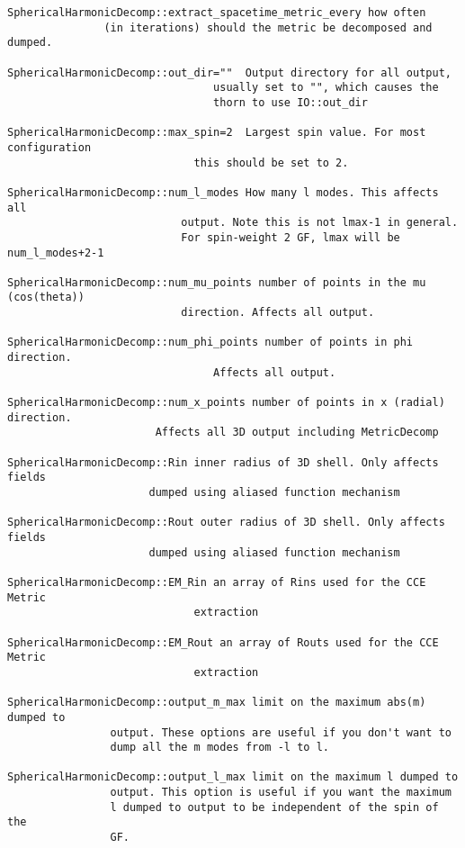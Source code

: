 \begin{verbatim}
SphericalHarmonicDecomp::extract_spacetime_metric_every how often 
               (in iterations) should the metric be decomposed and dumped.

SphericalHarmonicDecomp::out_dir=""  Output directory for all output,
                                usually set to "", which causes the
                                thorn to use IO::out_dir

SphericalHarmonicDecomp::max_spin=2  Largest spin value. For most configuration
                             this should be set to 2.

SphericalHarmonicDecomp::num_l_modes How many l modes. This affects all
                           output. Note this is not lmax-1 in general.
                           For spin-weight 2 GF, lmax will be num_l_modes+2-1

SphericalHarmonicDecomp::num_mu_points number of points in the mu (cos(theta))
                           direction. Affects all output.

SphericalHarmonicDecomp::num_phi_points number of points in phi direction.
                                Affects all output.

SphericalHarmonicDecomp::num_x_points number of points in x (radial) direction.
                       Affects all 3D output including MetricDecomp

SphericalHarmonicDecomp::Rin inner radius of 3D shell. Only affects fields
                      dumped using aliased function mechanism

SphericalHarmonicDecomp::Rout outer radius of 3D shell. Only affects fields
                      dumped using aliased function mechanism

SphericalHarmonicDecomp::EM_Rin an array of Rins used for the CCE Metric
                             extraction

SphericalHarmonicDecomp::EM_Rout an array of Routs used for the CCE Metric
                             extraction

SphericalHarmonicDecomp::output_m_max limit on the maximum abs(m) dumped to
                output. These options are useful if you don't want to
                dump all the m modes from -l to l.

SphericalHarmonicDecomp::output_l_max limit on the maximum l dumped to
                output. This option is useful if you want the maximum
                l dumped to output to be independent of the spin of the
                GF.
\end{verbatim}



